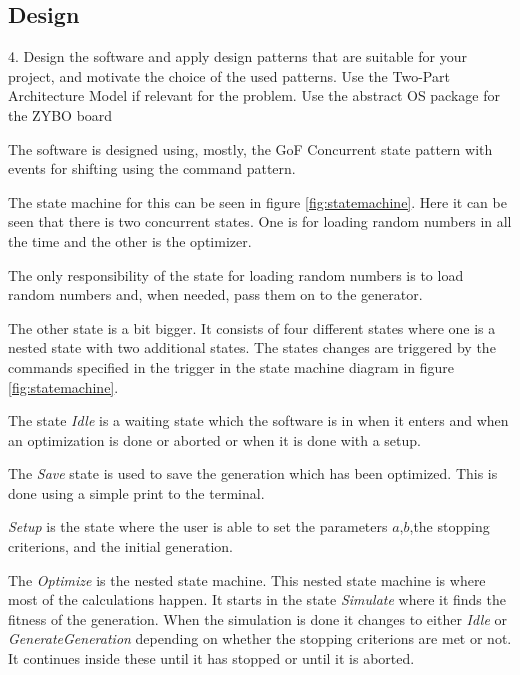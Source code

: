 \subsection{Design}
\begin{framed}
4. Design the software and apply design patterns that are suitable for your project, and motivate the choice of the used patterns. Use the Two-Part Architecture Model if relevant for the problem. Use the abstract OS package for the ZYBO board
\end{framed}

The software is designed using, mostly, the GoF Concurrent state pattern with events for shifting using the command pattern.

The state machine for this can be seen in figure \ref{fig:statemachine}. Here it can be seen that there is two concurrent states. One is for loading random numbers in all the time and the other is the optimizer.

The only responsibility of the state for loading random numbers is to load random numbers and, when needed, pass them on to the generator.

The other state is a bit bigger. It consists of four different states where one is a nested state with two additional states. 
The states changes are triggered by the commands specified in the trigger in the state machine diagram in figure \ref{fig:statemachine}.

The state \emph{Idle} is a waiting state which the software is in when it enters and when an optimization is done or aborted or when it is done with a setup.

The \emph{Save} state is used to save the generation which has been optimized. This is done using a simple print to the terminal. 

\emph{Setup} is the state where the user is able to set the parameters $a$,$b$,the stopping criterions, and the initial generation.

The \emph{Optimize} is the nested state machine. This nested state machine is where most of the calculations happen. It starts in the state \emph{Simulate} where it finds the fitness of the generation. When the simulation is done it changes to either \emph{Idle} or \emph{GenerateGeneration} depending on whether the stopping criterions are met or not. It continues inside these until it has stopped or until it is aborted.

